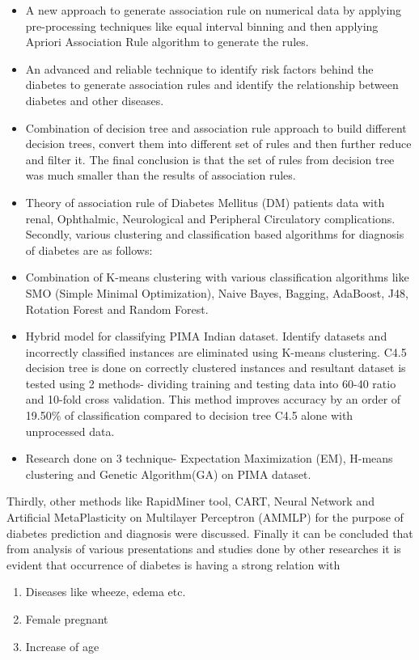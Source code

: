 \begin{itemize}
\item A new approach to generate association rule on numerical data by applying pre-processing techniques like equal interval binning and then applying Apriori Association Rule algorithm to generate the rules.
\item An advanced and reliable technique to identify risk factors behind the diabetes to generate association rules and identify the relationship between diabetes and other diseases.
\item Combination of decision tree and association rule approach to build different decision trees, convert them into different set of rules and then further reduce and filter it. The final conclusion is that the set of rules from decision tree was much smaller than the results of association rules.
\item Theory of association rule of Diabetes Mellitus (DM) patients data with renal, Ophthalmic, Neurological and Peripheral Circulatory complications.
Secondly, various clustering and classiﬁcation based algorithms for diagnosis of diabetes are as follows:
\item Combination of K-means clustering with various classification algorithms like SMO (Simple Minimal Optimization), Naive Bayes, Bagging, AdaBoost, J48, Rotation Forest and Random Forest.
\item Hybrid model for classifying PIMA Indian dataset. Identify datasets and incorrectly classiﬁed instances are eliminated using K-means clustering. C4.5 decision tree is done on correctly clustered instances and resultant dataset is tested using 2 methods- dividing training and testing data into 60-40 ratio and 10-fold cross validation. This method improves accuracy by an order of 19.50\% of classification compared to decision tree C4.5 alone with unprocessed data.
\item Research done on 3 technique- Expectation Maximization (EM), H-means clustering and Genetic Algorithm(GA) on PIMA dataset.
\end{itemize}
Thirdly, other methods like RapidMiner tool, CART, Neural Network and Artificial MetaPlasticity on Multilayer Perceptron (AMMLP) for the purpose of diabetes prediction and diagnosis were discussed. Finally it can be concluded that from analysis of various presentations and studies done by other researches it is evident that occurrence of diabetes is having a strong relation with
\begin{enumerate}
\item Diseases like wheeze, edema etc.
\item Female pregnant
\item Increase of age
\end{enumerate}
